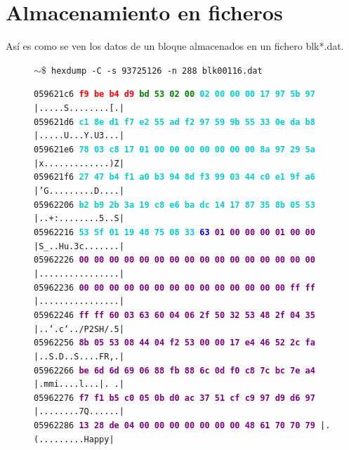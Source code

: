 \documentclass{article}
\begin{document}
\section{Almacenamiento en ficheros}
    Así es como se ven los datos de un bloque almacenados en un fichero blk*.dat.
    \begin{figure}[H]
    \scriptsize{\texttt{$\sim\$$ hexdump\ -C\ -s\ 93725126\ -n\ 288\ blk00116.dat}}
    
    \scriptsize{
    \texttt{059621c6  \textbf{\textcolor{red}{f9 be b4 d9} \textcolor{green}{bd 53 02 00}  \textcolor{darkTurquoise}{02 00 00 00 17 97 5b 97}}  |.....S........[.|} \\
    \texttt{059621d6  \textbf{\textcolor{darkTurquoise}{c1 8e d1 f7 e2 55 ad f2  97 59 9b 55 33 0e da b8}}  |.....U...Y.U3...|} \\
    \texttt{059621e6  \textbf{\textcolor{darkTurquoise}{78 03 c8 17 01 00 00 00  00 00 00 00 8a 97 29 5a}}  |x.............)Z|} \\
    \texttt{059621f6  \textbf{\textcolor{darkTurquoise}{27 47 b4 f1 a0 b3 94 8d  f3 99 03 44 c0 e1 9f a6}}  |'G.........D....|} \\
    \texttt{05962206  \textbf{\textcolor{darkTurquoise}{b2 b9 2b 3a 19 c8 e6 ba  dc 14 17 87 35 8b 05 53}}  |..+:........5..S|} \\
    \texttt{05962216  \textbf{\textcolor{darkTurquoise}{53 5f 01 19 48 75 08 33}  \textcolor{blue}{63} \textcolor{purple}{01 00 00 00 01 00 00}}  |S\_..Hu.3c.......|} \\
    \texttt{05962226  \textbf{\textcolor{purple}{00 00 00 00 00 00 00 00  00 00 00 00 00 00 00 00}}  |................|} \\
    \texttt{05962236  \textbf{\textcolor{purple}{00 00 00 00 00 00 00 00  00 00 00 00 00 00 ff ff}}  |................|} \\
    \texttt{05962246  \textbf{\textcolor{purple}{ff ff 60 03 63 60 04 06  2f 50 32 53 48 2f 04 35}}  |..`.c`../P2SH/.5|} \\
    \texttt{05962256  \textbf{\textcolor{purple}{8b 05 53 08 44 04 f2 53  00 00 17 e4 46 52 2c fa}}  |..S.D..S....FR,.|} \\
    \texttt{05962266  \textbf{\textcolor{purple}{be 6d 6d 69 06 88 fb 88  6c 0d f0 c8 7c bc 7e a4}}  |.mmi....l...|.~.|} \\
    \texttt{05962276  \textbf{\textcolor{purple}{f7 f1 b5 c0 05 0b d0 ac  37 51 cf c9 97 d9 d6 97}}  |........7Q......|} \\
    \texttt{05962286  \textbf{\textcolor{purple}{13 28 de 04 00 00 00 00  00 00 00 48 61 70 70 79}}  |.(.........Happy|} \\
}
\end{figure}
\end{document}
